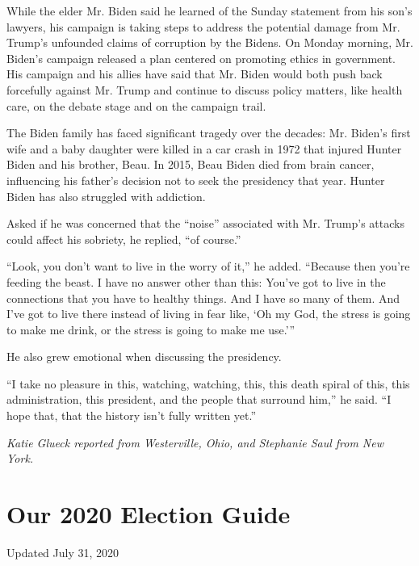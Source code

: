 While the elder Mr. Biden said he learned of the Sunday statement from
his son's lawyers, his campaign is taking steps to address the potential
damage from Mr. Trump's unfounded claims of corruption by the Bidens. On
Monday morning, Mr. Biden's campaign released a plan centered on
promoting ethics in government. His campaign and his allies have said
that Mr. Biden would both push back forcefully against Mr. Trump and
continue to discuss policy matters, like health care, on the debate
stage and on the campaign trail.

The Biden family has faced significant tragedy over the decades: Mr.
Biden's first wife and a baby daughter were killed in a car crash in
1972 that injured Hunter Biden and his brother, Beau. In 2015, Beau
Biden died from brain cancer, influencing his father's decision not to
seek the presidency that year. Hunter Biden has also struggled with
addiction.

Asked if he was concerned that the ``noise'' associated with Mr. Trump's
attacks could affect his sobriety, he replied, ``of course.''

``Look, you don't want to live in the worry of it,'' he added. ``Because
then you're feeding the beast. I have no answer other than this: You've
got to live in the connections that you have to healthy things. And I
have so many of them. And I've got to live there instead of living in
fear like, `Oh my God, the stress is going to make me drink, or the
stress is going to make me use.'''

He also grew emotional when discussing the presidency.

``I take no pleasure in this, watching, watching, this, this death
spiral of this, this administration, this president, and the people that
surround him,'' he said. ``I hope that, that the history isn't fully
written yet.''

\emph{Katie Glueck reported from Westerville, Ohio, and Stephanie Saul
from New York.}

\hypertarget{our-2020-election-guide}{%
\section{Our 2020 Election Guide}\label{our-2020-election-guide}}

Updated July 31, 2020

